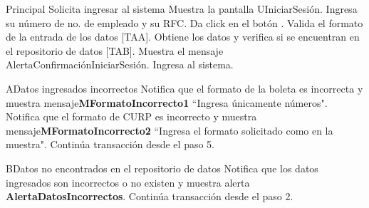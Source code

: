 \begin{UCtrayectoria}{Principal}
  \UCpaso[\UCactor] Solicita ingresar al sistema
  \UCpaso Muestra la pantalla UIniciarSesión.
  \UCpaso[\UCactor] Ingresa su número de no. de empleado y su RFC.
  \UCpaso[\UCactor]Da click en el botón .
  \UCpaso Valida el formato de la entrada de los datos [TAA].
  \UCpaso Obtiene los datos y verifica si se encuentran en el repositorio de datos [TAB].
  \UCpaso Muestra el mensaje AlertaConfirmaciónIniciarSesión. 
  \UCpaso[\UCactor]Ingresa al sistema.
\end{UCtrayectoria}


\begin{UCtrayectoriaA}{A}{Datos ingresados incorrectos}
  \UCpaso Notifica que el formato de la boleta es incorrecta y muestra mensaje{\bf MFormatoIncorrecto1} ``Ingresa únicamente números".
  \UCpaso Notifica que el formato de CURP es incorrecto y muestra mensaje{\bf MFormatoIncorrecto2} ``Ingresa el formato solicitado como en la muestra".
  \UCpaso Continúa transacción desde el paso 5.
\end{UCtrayectoriaA}

\begin{UCtrayectoriaA}{B}{Datos no encontrados en el repositorio de datos}
  \UCpaso Notifica que los datos ingresados son incorrectos o no existen y muestra alerta {\bf AlertaDatosIncorrectos}.
  \UCpaso Continúa transacción desde el paso 2.
\end{UCtrayectoriaA}
